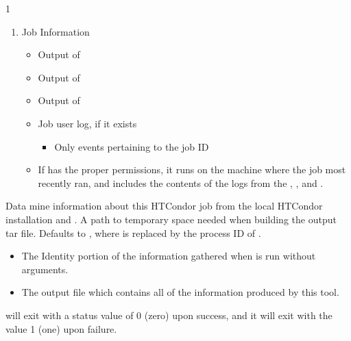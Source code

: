 \begin{ManPage}{\label{man-condor-gather-info}}{1}
\begin{enumerate}
\begin{itemize}
\begin{itemize}
		  \end{itemize}
	\end{itemize}
	\item Job Information
	\begin{itemize}
    	\item Output of 
    	\item Output of 
    	\item Output of 
    	\item Job user log, if it exists
		\begin{itemize}
          	\item Only events pertaining to the job ID 
		\end{itemize}
    	\item If  has the proper permissions,
it runs  on the machine where the job most recently ran,
and includes the contents of the logs from the ,
, and .
	\end{itemize}
\end{enumerate}

\begin{Options}
  {Data mine information about this HTCondor job from the local 
  HTCondor installation and .}
  {A path to temporary space needed when building the output tar file.
  Defaults to , where  is replaced by
  the process ID of .}
\end{Options}

\Files

\begin{itemize}
  \item{} The Identity portion of the information 
  gathered when  is run without arguments.

  \item{} The output file which contains all of 
  the information produced by this tool.
\end{itemize}

\ExitStatus

 will exit with a status value of 0 (zero) upon success,
and it will exit with the value 1 (one) upon failure.

\end{ManPage}
